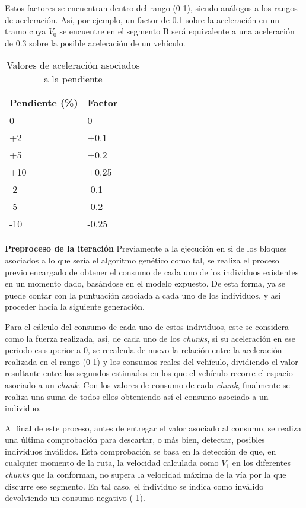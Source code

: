 \documentclass[11pt,spanish,listoffigures,listoftables]{tfgetsinf}
\begin{document}
\begin{itemize}
    Estos factores se encuentran dentro del rango (0-1), siendo análogos a los rangos de aceleración. Así, por ejemplo, un factor de 0.1 sobre la aceleración en un tramo cuya $V_{0}$ se encuentre en el segmento B será equivalente a una aceleración de 0.3 sobre la posible aceleración de un vehículo.
    
    \begin{table}[h]
    \centering
    \begin{tabular}{|l|l|l|l|}
    \hline
    \textbf{Pendiente (\%)} & \textbf{Factor} \\ \hline
    0       &   0       \\ \hline
    +2      &   +0.1    \\ \hline
    +5      &   +0.2    \\ \hline
    +10     &   +0.25   \\ \hline
    -2      &   -0.1    \\ \hline
    -5      &   -0.2    \\ \hline
    -10     &   -0.25   \\ \hline
    \end{tabular}
    \caption{Valores de aceleración asociados a la pendiente}
    \label{tab:v1_slope_accel}
    \end{table}
\end{itemize}

\textbf{Preproceso de la iteración}\newline
Previamente a la ejecución en si de los bloques asociados a lo que sería el algoritmo genético como tal, se realiza el proceso previo encargado de obtener el consumo de cada uno de los individuos existentes en un momento dado, basándose en el modelo expuesto. De esta forma, ya se puede contar con la puntuación asociada a cada uno de los individuos, y así proceder hacia la siguiente generación.

Para el cálculo del consumo de cada uno de estos individuos, este se considera como la fuerza realizada, así, de cada uno de los \textit{chunks}, si su aceleración en ese periodo es superior a 0, se recalcula de nuevo la relación entre la aceleración realizada en el rango (0-1) y los consumos reales del vehículo, dividiendo el valor resultante entre los segundos estimados en los que el vehículo recorre el espacio asociado a un \textit{chunk}. Con los valores de consumo de cada \textit{chunk}, finalmente se realiza una suma de todos ellos obteniendo así el consumo asociado a un individuo.

Al final de este proceso, antes de entregar el valor asociado al consumo, se realiza una última comprobación para descartar, o más bien, detectar, posibles individuos inválidos. Esta comprobación se basa en la detección de que, en cualquier momento de la ruta, la velocidad calculada como $V_{1}$ en los diferentes \textit{chunks} que la conforman, no supera la velocidad máxima de la vía por la que discurre ese segmento. En tal caso, el individuo se indica como inválido devolviendo un consumo negativo (-1).\newline
\end{document}

